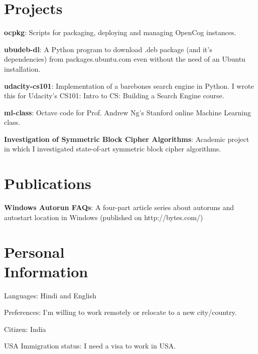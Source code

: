 \documentclass[margin,line]{resume}
\begin{document}
\begin{resume}
    \section{\mysidestyle Projects} 
	\begin{list2}
	\item \textbf{ocpkg}: Scripts for packaging, deploying and managing OpenCog instances.
	\item \textbf{ubudeb-dl}: A Python program to download .deb package (and it's dependencies) from packages.ubuntu.com even without the need of an Ubuntu installation.
	\item \textbf{udacity-cs101}: Implementation of a barebones search engine in Python. I wrote this for Udacity's CS101: Intro to CS: Building a Search Engine course.
	\item \textbf{ml-class}: Octave code for Prof. Andrew Ng's Stanford online Machine Learning class.
	\item \textbf{Investigation of Symmetric Block Cipher Algorithms}: Academic project in which I investigated state-of-art symmetric block cipher algorithms.
    \end{list2}

	\section{\mysidestyle Publications}
	\begin{list2}
	\item \textbf{Windows Autorun FAQs}: A four-part article series about autoruns and autostart location in Windows (published on http://bytes.com/)
	\end{list2}

    \section{\mysidestyle Personal \\ Information}
    \begin{list2}
    \item Languages: Hindi and English
    \item Preferences: I'm willing to work remotely or relocate to a new city/country.
    \item Citizen: India
    \item USA Immigration status: I need a visa to work in USA.
    \end{list2}


\end{resume}
\end{document}
